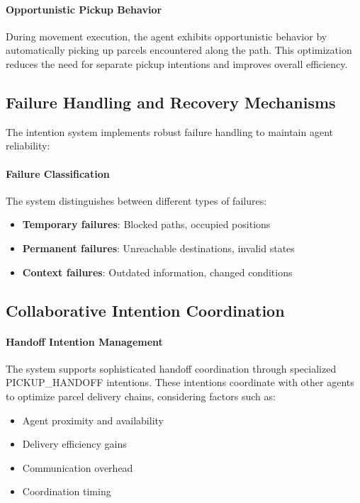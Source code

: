 \paragraph{Opportunistic Pickup Behavior}
During movement execution, the agent exhibits opportunistic behavior by automatically picking up parcels encountered along the path. This optimization reduces the need for separate pickup intentions and improves overall efficiency.

\subsection{Failure Handling and Recovery Mechanisms}

The intention system implements robust failure handling to maintain agent reliability:

\paragraph{Failure Classification}
The system distinguishes between different types of failures:
\begin{itemize}
    \item \textbf{Temporary failures}: Blocked paths, occupied positions
    \item \textbf{Permanent failures}: Unreachable destinations, invalid states
    \item \textbf{Context failures}: Outdated information, changed conditions
\end{itemize}

\subsection{Collaborative Intention Coordination}

\paragraph{Handoff Intention Management}
The system supports sophisticated handoff coordination through specialized PICKUP\_HANDOFF intentions. These intentions coordinate with other agents to optimize parcel delivery chains, considering factors such as:
\begin{itemize}
    \item Agent proximity and availability
    \item Delivery efficiency gains
    \item Communication overhead
    \item Coordination timing
\end{itemize}

